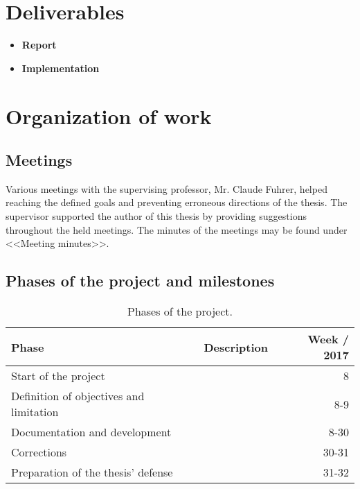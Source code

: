 \documentclass[
    a4paper,      %
    10pt,         %
    openright,    %
    notitlepage,  %
    parskip=half, %
]{scrreprt}       %
\theoremstyle{definition}                    %
\begin{document}
\section{Deliverables}
\label{sec:deliverables}

\begin{itemize}
\item \textbf{Report} \\
  \blindtext{}
\item \textbf{Implementation} \\
  \blindtext{}
\end{itemize}

\section{Organization of work}
\label{sec:organization-of-work}

\subsection{Meetings}
\label{subsec:meetings}

Various meetings with the supervising professor, Mr. Claude Fuhrer, helped
reaching the defined goals and preventing erroneous directions of the thesis.
The supervisor supported the author of this thesis by providing suggestions
throughout the held meetings. The minutes of the meetings may be found under
<<Meeting minutes>>.

\subsection{Phases of the project and milestones}
\label{subsec:project-phases-milestones}

\begin{table}[h]
  \begin{tabularx}{\textwidth}{|X|X|r|}
    \hline{}
    \textbf{Phase}   & \textbf{Description} & \textbf{Week / 2017} \\
    \hline{}
    Start of the project & & 8 \\
    Definition of objectives and limitation & & 8-9 \\
    Documentation and development & & 8-30 \\
    Corrections & & 30-31 \\
    Preparation of the thesis' defense & & 31-32 \\
    \hline
  \end{tabularx}
  \caption{Phases of the project.}
\end{table}
\end{document}
